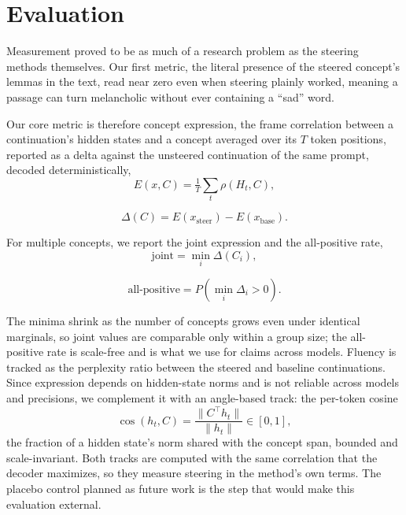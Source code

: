 \documentclass[a4paper,10pt,twocolumn]{article}
\begin{document}
\section{Evaluation}
Measurement proved to be as much of a research problem as the steering methods themselves. Our first metric, the literal presence of the steered concept's lemmas in the text, read near zero even when steering plainly worked, meaning a passage can turn melancholic without ever containing a ``sad'' word.

Our core metric is therefore concept expression, the frame correlation between a continuation's hidden states and a concept averaged over its $T$ token positions, reported as a delta against the unsteered continuation of the same prompt, decoded deterministically,
\begin{equation}
E(x, C) = \tfrac{1}{T}\textstyle\sum_t \rho(H_t, C),
\end{equation}

\begin{equation}
\Delta(C) = E(x_{\mathrm{steer}}) - E(x_{\mathrm{base}}).
\end{equation}


For multiple concepts, we report the joint expression and the all-positive rate,
\begin{equation}
\mathrm{joint} = \min_i \Delta(C_i),
\end{equation}

\begin{equation}
\text{all-positive} = P\!\left(\min_i \Delta_i > 0\right).
\end{equation}


The minima shrink as the number of concepts grows even under identical marginals, so joint values are comparable only within a group size; the all-positive rate is scale-free and is what we use for claims across models. Fluency is tracked as the perplexity ratio between the steered and baseline continuations. Since expression depends on hidden-state norms and is not reliable across models and precisions, we complement it with an angle-based track: the per-token cosine
\begin{equation}
\cos(h_t, C) = \frac{\lVert C^{\top} h_t \rVert}{\lVert h_t \rVert} \in [0,1],
\end{equation}
the fraction of a hidden state's norm shared with the concept span, bounded
and scale-invariant. Both tracks are computed with the same correlation that the decoder maximizes, so they measure steering in the method's own terms. The placebo control planned as future work is the step that would make this evaluation external.
\end{document}
